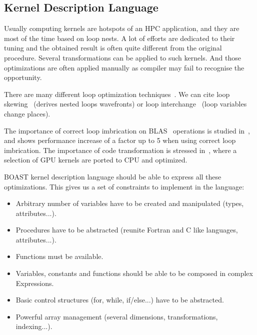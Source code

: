 \documentclass{IEEEtran}
\begin{document}
\subsection{Kernel Description Language}

Usually computing kernels are hotspots of an HPC application, and they are most
of the time based on loop nests. A lot of efforts are dedicated to their tuning
and the obtained result is often quite different from the original procedure.
Several transformations can be applied to such kernels. And those optimizations
are often applied manually as compiler may fail to recognise the opportunity.

There are many different loop optimization techniques~\cite{wolf1991loop}. We
can cite loop skewing~\cite{wolfe1986loops} (derives nested loops wavefronts)
or loop interchange~\cite{allen1984automatic} (loop variables change places).

The importance of  correct loop imbrication on BLAS~\cite{lawson1979basic}
operations is studied in~\cite{soliman2009performance}, and shows performance
increase of a factor up to 5 when using correct loop imbrication. The
importance of code transformation is stressed in~\cite{ye2011porting}, where a
selection of GPU kernels are ported to CPU and optimized.

BOAST kernel description language should be able to express all these
optimizations. This gives us a set of constraints to implement in the language:
\begin{itemize}
\item Arbitrary number of variables have to be created and manipulated (types,
attributes...).
\item Procedures have to be abstracted (reunite Fortran and C like languages,
attributes...).
\item Functions must be available.
\item Variables, constants and functions should be able to be composed in
complex Expressions.
\item Basic control structures (for, while, if/else...) have to be abstracted.
\item Powerful array management (several dimensions, transformations,
indexing...).
\end{itemize}
\end{document}
